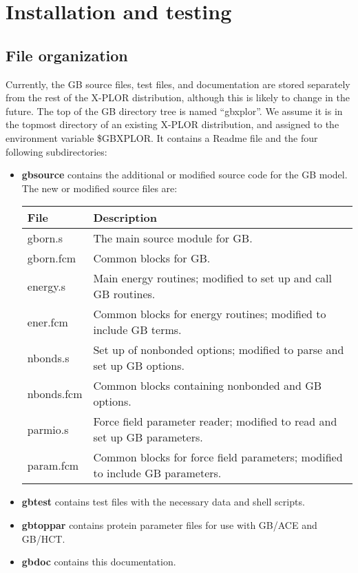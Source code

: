 \documentclass[12pt]{report}
\begin{document}
\section{Installation and testing}
\subsection{File organization}
Currently, the GB source files, test files, and documentation are stored
separately from the rest of the X-PLOR distribution, although this is likely
to change in the future. The top of the GB directory tree is named ``gbxplor''.
We assume it is in the topmost directory of an existing X-PLOR distribution,
and  assigned to the environment variable \$GBXPLOR. It contains a Readme file
and the four following subdirectories: 
\begin{itemize}
\item
{\bf gbsource} contains the additional or modified source code for the GB model.
The new or modified source files are:
\bigskip

\begin{tabular}{l l}
File &  Description \\ \hline
gborn.s & The main source module for GB. \\
gborn.fcm & Common blocks for GB. \\
energy.s & Main energy routines; modified to set up and call GB routines. \\
ener.fcm & Common blocks for energy routines; modified to include GB terms. \\
nbonds.s & Set up of nonbonded options; modified to parse and set up GB options. \\ 
nbonds.fcm & Common blocks containing nonbonded and GB options. \\
parmio.s & Force field parameter reader; modified to read and set up GB parameters. \\
param.fcm & Common blocks for force field parameters; modified to include GB parameters. \\
\hline
\end{tabular}
\medskip
\item
{\bf gbtest} contains test files with the necessary data and shell scripts.
\item
{\bf gbtoppar} contains protein parameter files for use with GB/ACE and GB/HCT.
\item
{\bf gbdoc} contains this documentation.
\end{itemize}
\end{document}
